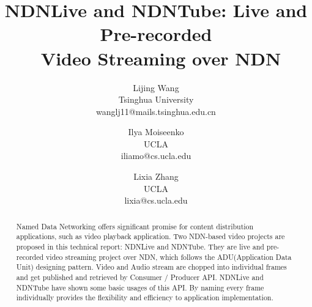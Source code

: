 \documentclass{sig-alternate}
\title{NDNLive and NDNTube: Live and Pre-recorded \\\ Video Streaming over NDN}
\author{
Lijing Wang \\ {\normalsize Tsinghua University} \\ {\normalsize wanglj11@mails.tsinghua.edu.cn }
\and Ilya Moiseenko \\ {\normalsize UCLA} \\ {\normalsize iliamo@cs.ucla.edu }
\and Lixia Zhang \\ {\normalsize UCLA} \\ {\normalsize lixia@cs.ucla.edu }
}
\begin{document}
\maketitle

\begin{abstract}
Named Data Networking offers significant promise for content distribution applications, such as video playback application. Two NDN-based video projects are proposed in this technical report: NDNLive and NDNTube. They are live and pre-recorded video streaming project over NDN, which follows the ADU(Application Data Unit) designing pattern. Video and Audio stream are chopped into individual frames and get published and retrieved by Consumer / Producer API. NDNLive and NDNTube have shown some basic usages of this API. By naming every frame individually provides the flexibility and efficiency to application implementation.
\end{abstract}








%


%



\end{document}
